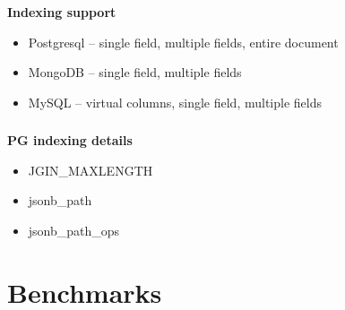 \documentclass[usenames,dvipsnames, 18pt, compress, aspectratio=169]{beamer}
\begin{document}
\begin{frame}
    \frametitle{}
    \textbf{Indexing support}
    \begin{center}
        \begin{itemize}[label={\MVRightarrow}]
            \item Postgresql -- single field, multiple fields, entire document
            \item MongoDB -- single field, multiple fields
            \item MySQL -- virtual columns, single field, multiple fields
        \end{itemize}
    \end{center}
\end{frame}

\begin{frame}
    \frametitle{}
    \textbf{PG indexing details}
    \begin{center}
        \begin{itemize}[label={\MVRightarrow}]
            \item JGIN\_MAXLENGTH
            \item jsonb\_path
            \item jsonb\_path\_ops
        \end{itemize}
    \end{center}
\end{frame}

\fontsize{13pt}{14}\selectfont
\section{Benchmarks}
\fontsize{17pt}{18}\selectfont

%
\begin{frame}
    \frametitle{}
\end{frame}
\end{document}
